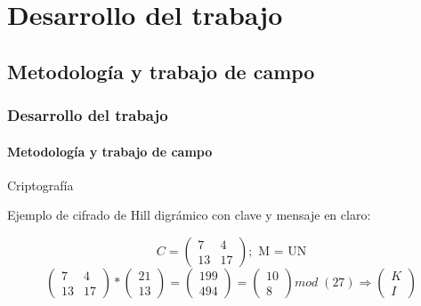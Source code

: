 \documentclass{beamer}
\begin{document}
       




\section{Desarrollo del trabajo}

\subsection{Metodología y trabajo de campo}


\begin{frame}
\frametitle{Desarrollo del trabajo}
    \framesubtitle{Metodología y trabajo de campo}
    

  
  \begin{block}{Criptografía}
  
  
   \end{block}
   Ejemplo de cifrado de Hill digrámico con clave y mensaje en claro:  

   
   \begin{equation*}
    C= \left(
    \begin{array}{cc}
    7 & 4 \\
    13 & 17
    \end{array}
    \right);\text{ M = UN}
\end{equation*}
   \small
   \begin{equation*}
    \left(
    \begin{array}{cc}
    7 & 4 \\
    13 & 17
    \end{array}
    \right) * \left(\begin{array}{c}
    21 \\
    13
    \end{array}
    \right)=\left(\begin{array}{c}
    199 \\
    494
    \end{array}
    \right) = \left(\begin{array}{c}
    10 \\
    8
    \end{array}
    \right) mod \; (27) \Rightarrow \left(\begin{array}{c}
    K \\
    I
    \end{array}
    \right)
\end{equation*}
\end{frame}
\end{document}
